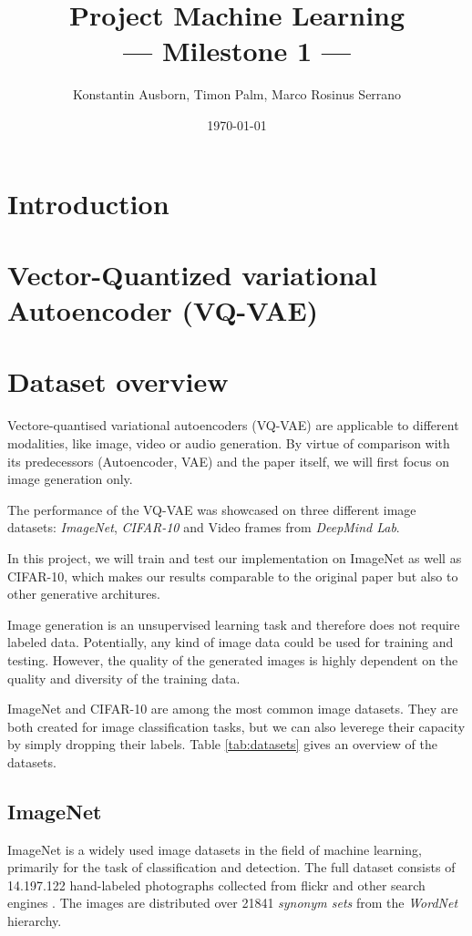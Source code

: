 \documentclass[10pt,a4paper,twoside]{article}
\title{Project Machine Learning\\--- Milestone 1 ---}
\author{Konstantin Ausborn, Timon Palm, Marco Rosinus Serrano}
\date{\today}
\begin{document}
\maketitle

\section{Introduction}


\section{Vector-Quantized variational Autoencoder (VQ-VAE)}
\label{sec:vqvae}


\section{Dataset overview}
    Vectore-quantised variational autoencoders (VQ-VAE) are applicable to different modalities, like image, video or audio generation. 
    By virtue of comparison with its predecessors (Autoencoder, VAE) and the paper itself, we will first focus on image generation only.

    The performance of the VQ-VAE was showcased on three different image datasets: \textit{ImageNet}, \textit{CIFAR-10} and Video frames from \textit{DeepMind Lab}.

    In this project, we will train and test our implementation on ImageNet as well as CIFAR-10, which makes our results comparable to the original paper but also to other generative architures.

    Image generation is an unsupervised learning task and therefore does not require labeled data. Potentially, any kind of image data could be used for training and testing. However, the quality of the generated images is highly dependent on the quality and diversity of the training data.

    ImageNet and CIFAR-10 are among the most common image datasets. They are both created for image classification tasks, but we can also leverege their capacity by simply dropping their labels. Table \ref{tab:datasets} gives an overview of the datasets.
    
    \subsection{ImageNet}
    ImageNet is a widely used image datasets in the field of machine learning, primarily for the task of classification and detection.
    The full dataset consists of 14.197.122 hand-labeled photographs collected from flickr and other search engines \cite{ILSVRC15}. The images are distributed over 21841 \textit{synonym sets} from the \textit{WordNet} \cite{wordnet} hierarchy.
\end{document}
